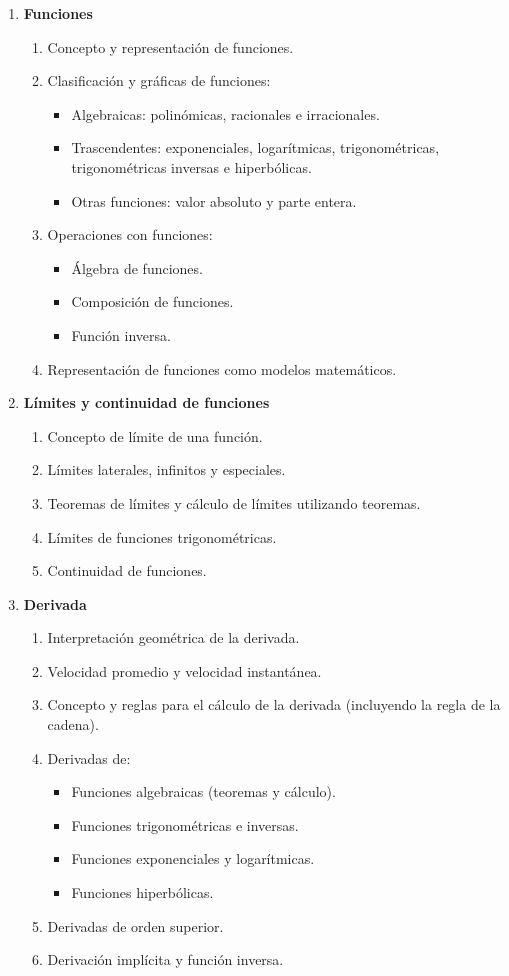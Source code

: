 \begin{enumerate}
\item \textbf{Funciones}
\begin{enumerate}[$a)$]
\item Concepto y representación de funciones.
\item Clasificación y gráficas de funciones:
    \begin{itemize}
        \item Algebraicas: polinómicas, racionales e irracionales.
        \item Trascendentes: exponenciales, logarítmicas, trigonométricas, trigonométricas inversas e hiperbólicas.
        \item Otras funciones: valor absoluto y parte entera.
    \end{itemize}
\item Operaciones con funciones:
    \begin{itemize}
        \item Álgebra de funciones.
        \item Composición de funciones.
        \item Función inversa.
    \end{itemize}
\item Representación de funciones como modelos matemáticos.
\end{enumerate}

\item \textbf{Límites y continuidad de funciones}
\begin{enumerate}[$a)$]
\item Concepto de límite de una función.
\item Límites laterales, infinitos y especiales.
\item Teoremas de límites y cálculo de límites utilizando teoremas.
\item Límites de funciones trigonométricas.
\item Continuidad de funciones.
\end{enumerate}

\item \textbf{Derivada}
\begin{enumerate}[$a)$]
\item Interpretación geométrica de la derivada.
\item Velocidad promedio y velocidad instantánea.
\item Concepto y reglas para el cálculo de la derivada (incluyendo la regla de la cadena).
\item Derivadas de:
    \begin{itemize}
        \item Funciones algebraicas (teoremas y cálculo).
        \item Funciones trigonométricas e inversas.
        \item Funciones exponenciales y logarítmicas.
        \item Funciones hiperbólicas.
    \end{itemize}
\item Derivadas de orden superior.
\item Derivación implícita y función inversa.
\end{enumerate}


\end{enumerate}
